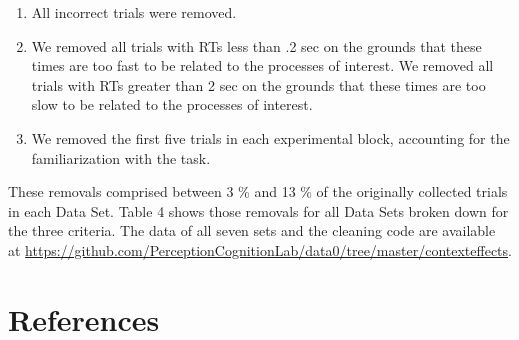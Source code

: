 \documentclass[american,man]{apa6}
\begin{document}
\begin{enumerate}
\def\labelenumi{\Roman{enumi}.}
\itemsep1pt\parskip0pt
\item
  All incorrect trials were removed.\\
\item
  We removed all trials with RTs less than .2 sec on the grounds that
  these times are too fast to be related to the processes of interest.
  We removed all trials with RTs greater than 2 sec on the grounds that
  these times are too slow to be related to the processes of interest.\\
\item
  We removed the first five trials in each experimental block,
  accounting for the familiarization with the task.
\end{enumerate}

These removals comprised between 3 \% and 13 \% of the originally
collected trials in each Data Set. Table 4 shows those removals for all
Data Sets broken down for the three criteria. The data of all seven sets
and the cleaning code are available at
\href{https://github.com/PerceptionCognitionLab/data0/tree/master/contexteffects}{\url{https://github.com/PerceptionCognitionLab/data0/tree/master/contexteffects}}.

\clearpage

\section{References}\label{references}

\setlength{\parindent}{-0.5in} \setlength{\leftskip}{0.5in}
\end{document}
